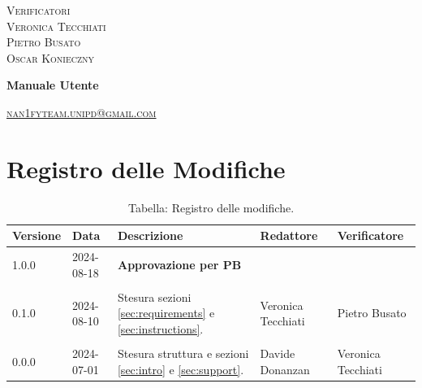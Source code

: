 \documentclass[8pt]{article}
\begin{document}
\begin{titlepage}
\begin{minipage}[t]{0.47\textwidth}
		{\large{\textsc{Verificatori}}
			\vspace{3mm}
			{\\\large{\textsc{Veronica Tecchiati}\\}} 
			{\large{\textsc{Pietro Busato}\\}} 
			{\large{\textsc{Oscar Konieczny}\\}}
			
		}
		\vspace{2mm}\vspace{2mm}
	\end{minipage}
	\vspace{4cm}
	\begin{center}
		\begin{flushright}
			{\fontsize{30pt}{52pt}\selectfont \textbf{Manuale Utente}} %
		\end{flushright}
		\vspace{3cm}
	\end{center}
	\vspace{10 cm}
	{\small \textsc{\href{mailto: nan1fyteam.unipd@gmail.com}{nan1fyteam.unipd@gmail.com}}}
\end{titlepage}
\pagestyle{mystyle}
\section*{Registro delle Modifiche}
\begin{table}[ht!]	
	\centering
	\begin{tabular}{p{1.2cm} p{2cm} p{5cm} p{3cm} p{3cm}}
		\toprule
		\textbf{Versione}& \textbf{Data} & \textbf{Descrizione} & \textbf{Redattore} & \textbf{Verificatore} \\
		\midrule
            1.0.0 & 2024-08-18 & \textbf{Approvazione per PB} & & \\\\
            0.1.0 & 2024-08-10 & Stesura sezioni \ref{sec:requirements} e \ref{sec:instructions}. & Veronica Tecchiati & Pietro Busato \\\\
		    0.0.0 & 2024-07-01 & Stesura struttura e sezioni \ref{sec:intro} e \ref{sec:support}. & Davide Donanzan & Veronica Tecchiati \\
		\bottomrule
	\end{tabular}
	\caption*{Tabella: Registro delle modifiche.}
	\label{table:Registro delle modifiche}
\end{table}
\newpage
\tableofcontents
\newpage
\listoffigures
\newpage
\newpage
\justifying
\end{document}
